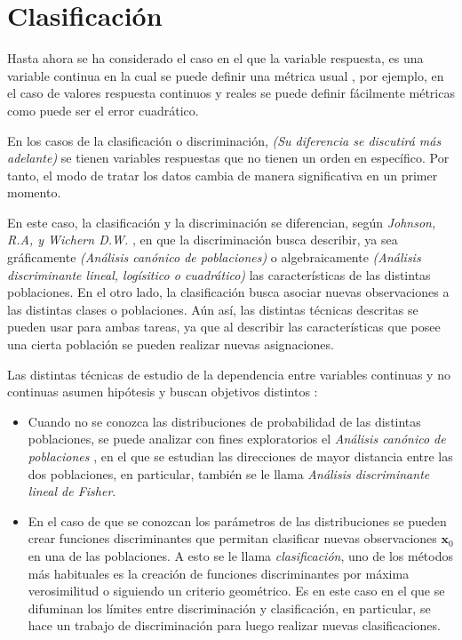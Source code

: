 \newpage
\section{Clasificación}

\noindent Hasta ahora se ha considerado el caso en el que la variable respuesta, es una variable continua en la cual se puede definir una métrica usual \cite{Hair 1995}, por ejemplo, en el caso de valores respuesta continuos y reales se puede definir fácilmente métricas como puede ser el error cuadrático. 

\noindent En los casos de la clasificación o discriminación, \emph{(Su diferencia se discutirá más adelante)} se tienen variables respuestas que no tienen un orden en específico. Por tanto, el modo de tratar los datos cambia de manera significativa en un primer momento.

\noindent En este caso, la clasificación y la discriminación se diferencian, según \emph{Johnson, R.A, y Wichern D.W.} \cite{Johnson 2007}, en que la discriminación busca describir, ya sea gráficamente \emph{(Análisis canónico de poblaciones)} o algebraicamente \emph{(Análisis discriminante lineal, logísitico o cuadrático)} las características de las distintas poblaciones. En el otro lado, la clasificación busca asociar nuevas observaciones a las distintas clases o poblaciones. Aún así, las distintas  técnicas descritas se pueden usar para ambas tareas, ya que al describir las características que posee una cierta población se pueden realizar nuevas asignaciones.  

\noindent Las distintas técnicas de estudio de la dependencia entre variables continuas y no continuas asumen hipótesis y buscan objetivos distintos \cite{Villardón 2006}:
\begin{itemize}
\item Cuando no se conozca las distribuciones de probabilidad de las distintas poblaciones, se puede analizar con fines exploratorios el \emph{Análisis canónico de poblaciones} \cite{Villardón 2006}, en el que se estudian las direcciones de mayor distancia entre las dos poblaciones, en particular, también se le llama \emph{Análisis discriminante lineal de Fisher}\cite{Lebart 1984}.

\item En el caso de que se conozcan los parámetros de las distribuciones se pueden crear funciones discriminantes que permitan clasificar nuevas observaciones $\mathbf{x}_0$ en una de las poblaciones. A esto se le llama \emph{clasificación}, uno de los métodos más habituales es la creación de funciones discriminantes por máxima verosimilitud o siguiendo un criterio geométrico\cite{Peña 2002}. Es en este caso en el que se difuminan los límites entre discriminación y clasificación, en particular, se hace un trabajo de discriminación para luego realizar nuevas clasificaciones.
\end{itemize}

